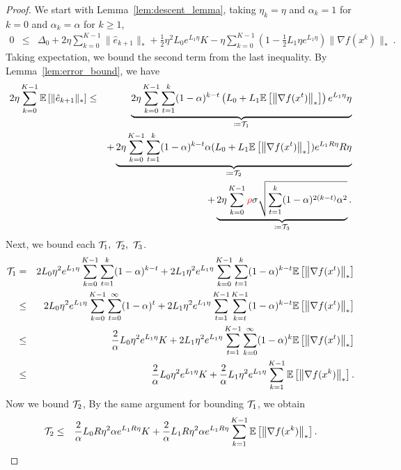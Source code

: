 \documentclass{article}
\begin{document}
\begin{proof}
    We start with Lemma~\ref{lem:descent_lemma}, taking $\eta_k = \eta$ and $\alpha_k = 1$ for $k = 0$ and $\alpha_k =\alpha$ for $k \ge 1$, 
    \begin{eqnarray}
        0 &\leq& \Delta_0 + 2\eta \sum^{K-1}_{k=0}\|\hat e_{k+1}\|_* +\frac{1}{2}\eta^2 L_0 e^{L_1\eta}K - \eta \sum^{K-1}_{k=0}\left(1-\frac{1}{2}L_1\eta e^{L_1\eta}\right)\|\nabla f(x^k)\|_* ~. \label{eq:bjhsdvbsdk}
    \end{eqnarray}
    Taking expectation, we bound the second term from the last inequality.
    By Lemma~\ref{lem:error_bound}, we have
    \begin{eqnarray*}
        2\eta \sum^{K-1}_{k=0}{\mathbb{E}}\left[\|\hat e_{k+1}\|_*\right]  &\leq&  \underbrace{2\eta \sum^{K-1}_{k=0}\sum_{t=1}^k (1-\alpha)^{k-t} \left(L_0 + L_1{\mathbb{E}}\left[\left\| \nabla f(x^t) \right\|_*\right]\right)e^{L_1\eta}\eta}_{\coloneqq \mathcal{T}_1}\\
        && + \underbrace{2\eta \sum^{K-1}_{k=0} \sum_{t=1}^k(1-\alpha)^{k-t}\alpha (L_0 + L_1 {\mathbb{E}}\left[\left\| \nabla f(x^t) \right\|_*\right])e^{L_1 R\eta}R\eta}_{\coloneqq \mathcal{T}_2}\\
         && + \underbrace{2\eta \sum^{K-1}_{k=0}{\color{red} \rho} \sigma\sqrt{\sum_{t=1}^k (1-\alpha)^{2(k-t)}\alpha^2}}_{\coloneqq \mathcal{T}_3}.
    \end{eqnarray*}
    Next, we bound each $\mathcal{T}_1,~\mathcal{T}_2,~\mathcal{T}_3$. 
    \begin{eqnarray}
        \mathcal{T}_1 &=& 2L_0\eta^2 e^{L_1\eta} \sum^{K-1}_{k=0}\sum_{t=1}^k (1-\alpha)^{k-t}  +  2L_1\eta^2 e^{L_1\eta} \sum^{K-1}_{k=0}\sum_{t=1}^k (1-\alpha)^{k-t}  {\mathbb{E}}\left[\left\| \nabla f(x^t) \right\|_*\right] \notag\\
        &\leq& 2L_0\eta^2 e^{L_1\eta} \sum^{K-1}_{k=0}\sum_{t=0}^{\infty} (1-\alpha)^{t}  +  2L_1\eta^2 e^{L_1\eta} \sum_{t=1}^{K-1}\sum^{K-1}_{k=t} (1-\alpha)^{k-t}  {\mathbb{E}}\left[\left\| \nabla f(x^t) \right\|_*\right] \notag\\
        &\leq&  \frac{2}{\alpha}L_0\eta^2 e^{L_1\eta} K + 2L_1\eta^2 e^{L_1\eta} \sum_{t=1}^{K-1}\sum^{\infty}_{k=0} (1-\alpha)^{k}  {\mathbb{E}}\left[\left\| \nabla f(x^t) \right\|_*\right] \notag\\
        &\leq& \frac{2}{\alpha}L_0\eta^2 e^{L_1\eta} K + \frac{2}{\alpha}L_1\eta^2 e^{L_1\eta} \sum_{k=1}^{K-1} {\mathbb{E}}\left[\left\| \nabla f(x^k) \right\|_*\right]. \label{eq:bound_T_1}
    \end{eqnarray}
    Now we bound $\mathcal{T}_2$, By the same argument for bounding $\mathcal{T}_1$, we obtain 
    \begin{eqnarray}
        \cT_2 &\leq& \frac{2}{\alpha}L_0R\eta^2\alpha e^{L_1R\eta} K + \frac{2}{\alpha}L_1R\eta^2\alpha e^{L_1R\eta} \sum_{k=1}^{K-1} \Exp{\norm{\nabla f(x^k)}_*}. \label{eq:bound_T_2}

\end{eqnarray}
\end{proof}
\end{document}
